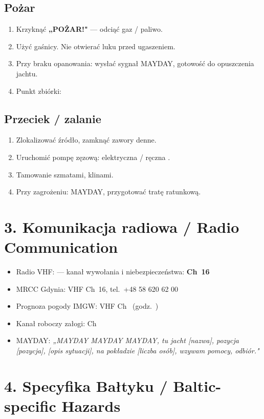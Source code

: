 \documentclass[a4paper,11pt]{article}
\begin{document}
\subsection*{Pożar}
\begin{enumerate}[noitemsep]
    \item Krzyknąć \textbf{„POŻAR!"} — odciąć gaz / paliwo.
    \item Użyć gaśnicy. Nie otwierać luku przed ugaszeniem.
    \item Przy braku opanowania: wysłać sygnał MAYDAY, gotowość do opuszczenia jachtu.
    \item Punkt zbiórki: \field{5cm}
\end{enumerate}

\subsection*{Przeciek / zalanie}
\begin{enumerate}[noitemsep]
    \item Zlokalizować źródło, zamknąć zawory denne.
    \item Uruchomić pompę zęzową: elektryczna \field{3cm} / ręczna \field{3cm}.
    \item Tamowanie szmatami, klinami.
    \item Przy zagrożeniu: MAYDAY, przygotować tratę ratunkową.
\end{enumerate}

\section*{3. Komunikacja radiowa / Radio Communication}

\begin{itemize}[noitemsep]
    \item Radio VHF: \field{3cm} — kanał wywołania i niebezpieczeństwa: \textbf{Ch~16}
    \item MRCC Gdynia: VHF Ch~16, tel.\ +48 58 620 62 00
    \item Prognoza pogody IMGW: VHF Ch~\field{1.5cm} (godz.\ \field{2cm})
    \item Kanał roboczy załogi: Ch~\field{1.5cm}
    \item MAYDAY: \textit{„MAYDAY MAYDAY MAYDAY, tu jacht [nazwa], pozycja [pozycja], [opis sytuacji], na pokładzie [liczba osób], wzywam pomocy, odbiór."}
\end{itemize}

\section*{4. Specyfika Bałtyku / Baltic-specific Hazards}
\end{document}
